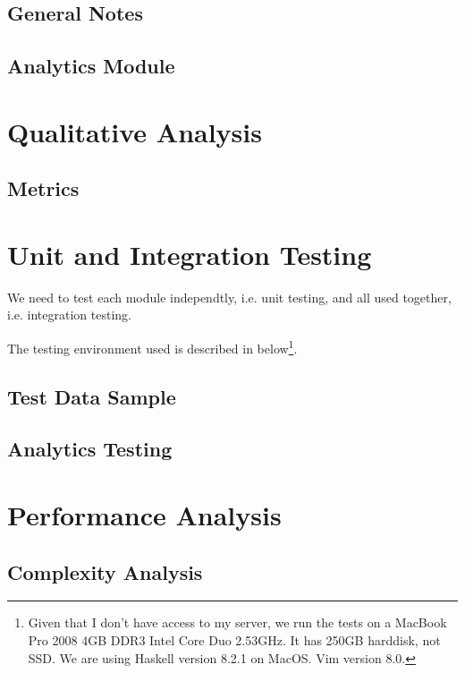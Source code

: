 \documentclass[12pt,a4paper,titlepage]{article}
\begin{document}
\subsection{General Notes}

\subsection{Analytics Module}

\section{Qualitative Analysis}
\label{sec:quality}

\subsection{Metrics}

\section{Unit and Integration Testing}
We need to test each module independtly, i.e. unit testing, and all used 
together, i.e. integration testing.

The testing environment used is described in below\footnote{
Given that I don't have access to my server, 
we run the tests on a MacBook Pro 2008 4GB DDR3 Intel Core Duo 2.53GHz.
It has 250GB harddisk, not SSD. 
We are using Haskell version 8.2.1 on MacOS. Vim version 8.0.
}.


\subsection{Test Data Sample}


\subsection{Analytics Testing} 

\section{Performance Analysis}
\label{sec:perf}

\subsection{Complexity Analysis}
\end{document}

